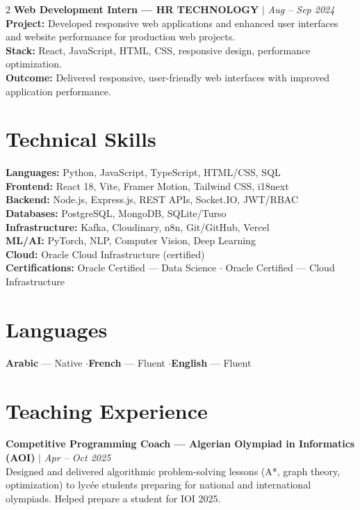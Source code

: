 \documentclass[8pt, letterpaper]{extarticle}
\begin{document}
\begin{multicols}{2}
\textbf{Web Development Intern — HR TECHNOLOGY} \textcolor{rulecolor}{$|$} \textit{Aug – Sep 2024} \\
\textbf{Project:} Developed responsive web applications and enhanced user interfaces and website performance for production web projects. \\
\textbf{Stack:} React, JavaScript, HTML, CSS, responsive design, performance optimization. \\
\textbf{Outcome:} Delivered responsive, user-friendly web interfaces with improved application performance.

\section*{{\color{accent}}\; Technical Skills}
\textbf{Languages:} Python, JavaScript, TypeScript, HTML/CSS, SQL \\
\textbf{Frontend:} React 18, Vite, Framer Motion, Tailwind CSS, i18next \\
\textbf{Backend:} Node.js, Express.js, REST APIs, Socket.IO, JWT/RBAC \\
\textbf{Databases:} PostgreSQL, MongoDB, SQLite/Turso \\
\textbf{Infrastructure:} Kafka, Cloudinary, n8n, Git/GitHub, Vercel \\
\textbf{ML/AI:} PyTorch, NLP, Computer Vision, Deep Learning \\
\textbf{Cloud:} Oracle Cloud Infrastructure (certified) \vspace{3pt} \\
\textbf{Certifications:} Oracle Certified — Data Science \;\textcolor{rulecolor}{$\boldsymbol{\cdot}$}\; Oracle Certified — Cloud Infrastructure

\section*{{\color{accent}}\; Languages}
\textbf{Arabic} — Native \quad\textcolor{rulecolor}{$\boldsymbol{\cdot}$}\quad \textbf{French} — Fluent \quad\textcolor{rulecolor}{$\boldsymbol{\cdot}$}\quad \textbf{English} — Fluent

\section*{{\color{accent}}\; Teaching Experience}
\textbf{Competitive Programming Coach — Algerian Olympiad in Informatics (AOI)} \textcolor{rulecolor}{$|$} \textit{Apr – Oct 2025} \\
Designed and delivered algorithmic problem-solving lessons (A*, graph theory, optimization) to lycée students preparing for national and international olympiads. Helped prepare a student for IOI 2025.


\end{multicols}
\end{document}

